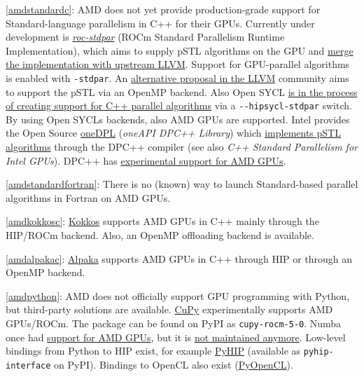 \item \ref{amdstandardc}: AMD does not yet provide production-grade support for Standard-language parallelism in C++ for their GPUs. Currently under development is \href{https://github.com/ROCmSoftwarePlatform/roc-stdpar}{\emph{roc-stdpar}} (ROCm Standard Parallelism Runtime Implementation), which aims to supply pSTL algorithms on the GPU and \href{https://discourse.llvm.org/t/rfc-adding-c-parallel-algorithm-offload-support-to-clang-llvm/72159}{merge the implementation with upstream LLVM}. Support for GPU-parallel algorithms is enabled with \texttt{-stdpar}. An \href{https://discourse.llvm.org/t/rfc-openmp-offloading-backend-for-c-parallel-algorithms/73468}{alternative proposal in the LLVM} community aims to support the pSTL via an OpenMP backend. Also Open SYCL \href{https://github.com/OpenSYCL/OpenSYCL/pull/1088}{is in the process of creating support for C++ parallel algorithms} via a \texttt{-\/-hipsycl-stdpar} switch. By using Open SYCL\textquotesingle s backends, also AMD GPUs are supported. Intel provides the Open Source \href{https://github.com/oneapi-src/oneDPL}{oneDPL} (\emph{oneAPI DPC++ Library}) which \href{https://oneapi-src.github.io/oneDPL/parallel_api_main.html}{implements pSTL algorithms} through the DPC++ compiler (see also \emph{C++ Standard Parallelism for Intel GPUs}). DPC++ has \href{https://intel.github.io/llvm-docs/GetStartedGuide.html\#build-dpc-toolchain-with-support-for-hip-amd}{experimental support for AMD GPUs}.
\item \ref{amdstandardfortran}: There is no (known) way to launch Standard-based parallel algorithms in Fortran on AMD GPUs.
\item \ref{amdkokkosc}: \href{https://github.com/kokkos/kokkos}{Kokkos} supports AMD GPUs in C++ mainly through the HIP/ROCm backend. Also, an OpenMP offloading backend is available.
\item \ref{amdalpakac}: \href{https://github.com/alpaka-group/alpaka}{Alpaka} supports AMD GPUs in C++ through HIP or through an OpenMP backend.
\item \ref{amdpython}: AMD does not officially support GPU programming with Python, but third-party solutions are available. \href{https://docs.cupy.dev/en/latest/install.html\#using-cupy-on-amd-gpu-experimental}{CuPy} experimentally supports AMD GPUs/ROCm. The package can be found on PyPI as \texttt{cupy-rocm-5-0}. Numba once had \href{https://numba.pydata.org/numba-doc/latest/roc/index.html}{support for AMD GPUs}, but it is \href{https://numba.readthedocs.io/en/stable/release-notes.html\#version-0-54-0-19-august-2021}{not maintained anymore}. Low-level bindings from Python to HIP exist, for example \href{https://github.com/jatinx/PyHIP}{PyHIP} (available as \texttt{pyhip-interface} on PyPI). Bindings to OpenCL also exist (\href{https://documen.tician.de/pyopencl/}{PyOpenCL}).
